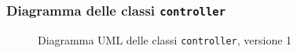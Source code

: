 \subsubsection{Diagramma delle classi \texttt{controller}}
\vspace{0.5cm}
\begin{figure}[H]
    \centering
    \caption{Diagramma UML delle classi \texttt{controller}, versione 1}
    \label{fig:class_controller_v_1}
\end{figure}